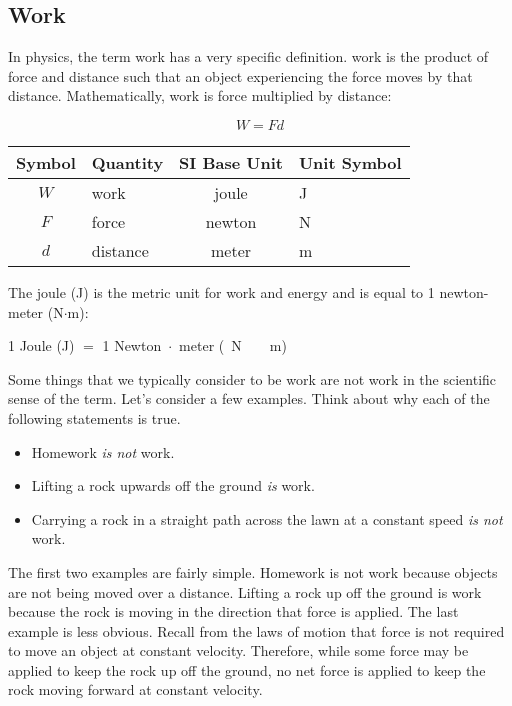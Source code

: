 \documentclass[main.tex]{subfiles}
\begin{document}
\clearpage

\subsection{Work} \label{obMgG8}

In physics, the term work has a very specific definition. \Gls{work} is the product of force and distance such that an object experiencing the force moves by that distance. Mathematically, work is force multiplied by distance:

\begin{equation} \label{y0Z6Cw}
    W = F d
\end{equation}

\begin{center}
    \begin{tabular}{cl|cl}
    \hline
    \textbf{Symbol} & \textbf{Quantity} & \textbf{SI Base Unit} & \textbf{Unit Symbol}  \\
    \hline\hline
    \rule{0pt}{2.5ex}
        $W$ & work & joule & J\\
        $F$ & force & newton & N\\
        $d$ & distance & meter & m\\
    \hline
    \end{tabular}
\end{center}

The \gls{joule} (J) is the metric unit for work and energy and is equal to 1 newton-meter (N$\cdot$m):

\begin{center}
    1 Joule (J) $=$ 1 Newton $\!\cdot\!$ meter (\SI{}{N\!\cdot\!m})
\end{center}

Some things that we typically consider to be work are not work in the scientific sense of the term. Let's consider a few examples. Think about why each of the following statements is true.

\begin{itemize}
\setlength\itemsep{-0.8ex}
    \item Homework \textit{is not} work.
    \item Lifting a rock upwards off the ground \textit{is} work.
    \item Carrying a rock in a straight path across the lawn at a constant speed \textit{is not} work.
\end{itemize}

The first two examples are fairly simple. Homework is not work because objects are not being moved over a distance. Lifting a rock up off the ground is work because the rock is moving in the direction that force is applied. The last example is less obvious. Recall from the laws of motion that force is not required to move an object at constant velocity. Therefore, while some force may be applied to keep the rock up off the ground, no net force is applied to keep the rock moving forward at constant velocity.
\end{document}
